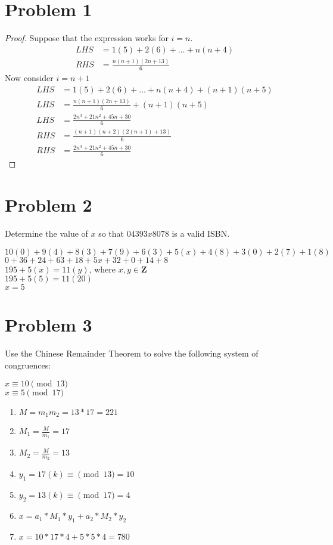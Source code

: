 \documentclass{article}
\newenvironment{problem}[1]{
  \nobreak\section*{Problem #1}
}{}
\begin{document}
\begin{problem}{1}
\begin{proof}
      Suppose that the expression works for $i = n$.
      \begin{equation*}
        \begin{split}
          LHS & = 1(5) + 2(6) + \dots + n(n + 4)\\
          RHS & = \frac{n(n + 1)(2n + 13)}{6}
        \end{split}
      \end{equation*}
      Now consider $i = n + 1$
      \begin{equation*}
        \begin{split}
          LHS & = 1(5) + 2(6) + \dots + n(n + 4) + (n + 1)(n + 5)\\
          LHS & = \frac{n(n + 1)(2n + 13)}{6} + (n + 1)(n + 5)\\
          LHS & = \frac{2n^3 + 21n^2 + 45n + 30}{6}\\
          RHS & = \frac{(n + 1)(n + 2)(2(n + 1) + 13)}{6}\\
          RHS & = \frac{2n^3 + 21n^2 + 45n + 30}{6}
        \end{split}
      \end{equation*}
    \end{proof}
  \end{problem}

  \begin{problem}{2}
    Determine the value of $x$ so that $04393x8078$ is a valid ISBN.
    \begin{center}
      $10(0) + 9(4) + 8(3) + 7(9) + 6(3) + 5(x) + 4(8) + 3(0) + 2(7) + 1(8)$\\
      $0 + 36 + 24 + 63 + 18 + 5x + 32 + 0 + 14 + 8$\\
      $195 + 5(x) = 11(y)$, where $x, y \in \mathbf{Z}$\\
      $195 + 5(5) = 11(20)$\\
      $x = 5$
    \end{center}
  \end{problem}

  \begin{problem}{3}
    Use the Chinese Remainder Theorem to solve the following system of congruences:
    \begin{center}
      $x \equiv 10 \pmod{13}$\\
      $x \equiv 5 \pmod{17}$
    \end{center}
    \begin{enumerate}
      \item [] $M = m_1m_2 = 13 * 17 = 221$
      \item [] $M_1 = \frac{M}{m_1} = 17$
      \item [] $M_2 = \frac{M}{m_2} = 13$
      \item [] $y_1 = 17(k) \equiv \pmod{13} = 10$
      \item [] $y_2 = 13(k) \equiv \pmod{17} = 4$
      \item [] $x = a_1 * M_1 * y_1 + a_2 * M_2 * y_2$
      \item [] $x = 10 * 17 * 4 + 5 * 5 * 4 = 780$
    \end{enumerate}
  \end{problem}
\end{document}
